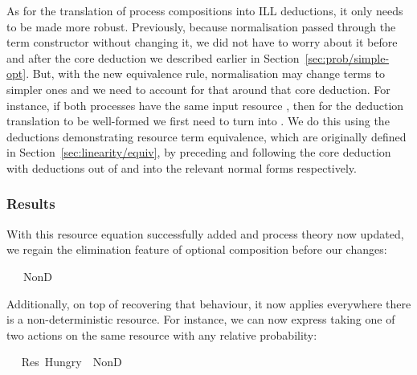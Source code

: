 \documentclass[class=smolathesis,crop=false]{standalone}
\begin{document}
As for the translation of process compositions into ILL deductions, it only needs to be made more robust.
Previously, because normalisation passed through the  term constructor without changing it, we did not have to worry about it before and after the core deduction we described earlier in Section~\ref{sec:prob/simple-opt}.
But, with the new equivalence rule, normalisation may change  terms to simpler ones and we need to account for that around that core deduction.
For instance, if both processes have the same input resource , then for the deduction translation to be well-formed we first need to turn  into .
We do this using the deductions demonstrating resource term equivalence, which are originally defined in Section~\ref{sec:linearity/equiv}, by preceding and following the core deduction with deductions out of and into the relevant normal forms respectively.

\subsubsection{Results}
\label{sec:prob/simple-opt/no-matter/results}

With this resource equation successfully added and process theory now updated, we regain the elimination feature of optional composition before our changes:
\begin{isabelle}
\centering
  \ \isasymLongrightarrow\ \isacharcolon\ NonD\ \ \isasymrightarrow\ 
\end{isabelle}

Additionally, on top of recovering that behaviour, it now applies everywhere there is a non-deterministic resource.
For instance, we can now express taking one of two actions on the same resource with any relative probability:
\begin{isabelle}
\centering
  \ \isasymLongrightarrow\isanewline
  \isacharcolon\ Res\ Hungry\ \isasymrightarrow\ NonD\ \ \ 
\end{isabelle}
\end{document}
